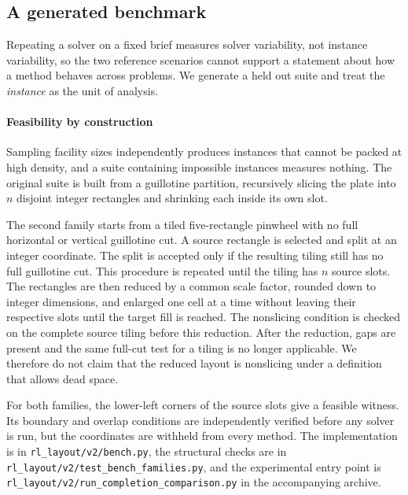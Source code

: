 \documentclass[preprint,12pt,authoryear]{elsarticle}
\newcommand{\code}[1]{\texttt{#1}}
\begin{document}
\subsection{A generated benchmark}
\label{sec:bench}
Repeating a solver on a fixed brief measures solver variability, not instance
variability, so the two reference scenarios cannot support a statement about how
a method behaves across problems. We generate a held out suite and treat the
\emph{instance} as the unit of analysis.

\paragraph{Feasibility by construction}
Sampling facility sizes independently produces instances that cannot be packed
at high density, and a suite containing impossible instances measures nothing.
The original suite is built from a guillotine partition, recursively slicing
the plate into $n$ disjoint integer rectangles and shrinking each inside its own
slot.

The second family starts from a tiled five-rectangle pinwheel with no full
horizontal or vertical guillotine cut. A source rectangle is selected and split
at an integer coordinate. The split is accepted only if the resulting tiling
still has no full guillotine cut. This procedure is repeated until the tiling has
$n$ source slots. The rectangles are then reduced by a common scale factor,
rounded down to integer dimensions, and enlarged one cell at a time without
leaving their respective slots until the target fill is reached. The nonslicing
condition is checked on the complete source tiling before this reduction. After
the reduction, gaps are present and the same full-cut test for a tiling is no
longer applicable. We therefore do not claim that the reduced layout is
nonslicing under a definition that allows dead space.

For both families, the lower-left corners of the source slots give a feasible
witness. Its boundary and overlap conditions are independently verified before
any solver is run, but the coordinates are withheld from every method. The
implementation is in \code{rl\_layout/v2/bench.py}, the structural checks are in
\code{rl\_layout/v2/test\_bench\_families.py}, and the experimental entry point is
\code{rl\_layout/v2/run\_completion\_comparison.py} in the accompanying archive.
\end{document}

